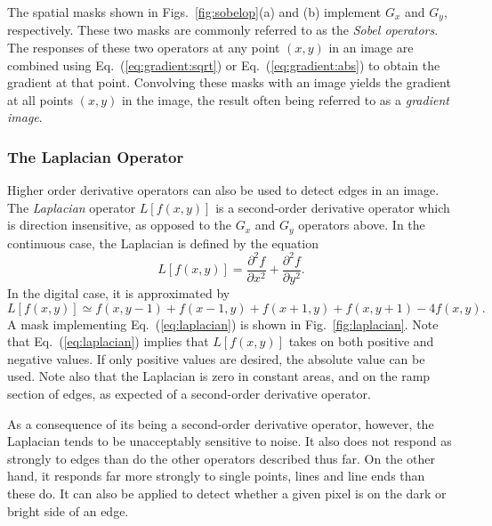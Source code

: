 The spatial masks shown in Figs.~\ref{fig:sobelop}(a) and (b)
implement $G_{x}$ and $G_{y}$, respectively.  These two masks are
commonly referred to as the {\em Sobel operators\/}.  The responses of
these two operators at any point $(x,y)$ in an image are combined
using Eq.~(\ref{eq:gradient:sqrt}) or Eq.~(\ref{eq:gradient:abs}) to
obtain the gradient at that point.  Convolving these masks with an
image yields the gradient at all points $(x,y)$ in the image, the
result often being referred to as a {\em gradient image\/}.

\subsubsection{The Laplacian Operator}

Higher order derivative operators can also be used to detect edges in
an image.  The {\em Laplacian\/} operator $L[f(x,y)]$ is a
second-order derivative operator which is direction insensitive, as
opposed to the $G_{x}$ and $G_{y}$ operators above.  In the continuous
case, the Laplacian is defined by the equation
\begin{equation}
  L[f(x,y)]=\frac{\partial^{2}f}{\partial x^{2}}+
  \frac{\partial^{2}f}{\partial y^{2}}\mbox{.}
\end{equation}
In the digital case, it is approximated by
\begin{equation}
\label{eq:laplacian}
  L[f(x,y)]\simeq f(x,y-1)+f(x-1,y)+f(x+1,y)+f(x,y+1)-4f(x,y)\mbox{.}
\end{equation}
A mask implementing Eq.~(\ref{eq:laplacian}) is shown in
Fig.~\ref{fig:laplacian}.  Note that Eq.~(\ref{eq:laplacian}) implies
that $L[f(x,y)]$ takes on both positive and negative values.  If only
positive values are desired, the absolute value can be used.  Note
also that the Laplacian is zero in constant areas, and on the ramp
section of edges, as expected of a second-order derivative operator.

As a consequence of its being a second-order derivative operator,
however, the Laplacian tends to be unacceptably sensitive to noise.
It also does not respond as strongly to edges than do the other
operators described thus far.  On the other hand, it responds far more
strongly to single points, lines and line ends than these do.  It can
also be applied to detect whether a given pixel is on the dark or
bright side of an edge.


